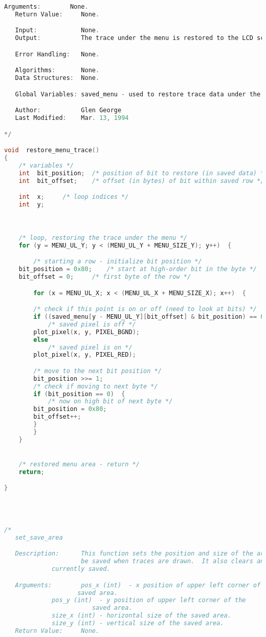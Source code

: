 \begin{lstlisting}[language=C]
   Arguments:        None.
   Return Value:     None.

   Input:            None.
   Output:           The trace under the menu is restored to the LCD screen.

   Error Handling:   None.

   Algorithms:       None.
   Data Structures:  None.

   Global Variables: saved_menu - used to restore trace data under the menu.

   Author:           Glen George
   Last Modified:    Mar. 13, 1994

*/

void  restore_menu_trace()
{
    /* variables */
    int  bit_position;	/* position of bit to restore (in saved data) */
    int  bit_offset;    /* offset (in bytes) of bit within saved row */

    int  x;		/* loop indices */
    int  y;



    /* loop, restoring the trace under the menu */
    for (y = MENU_UL_Y; y < (MENU_UL_Y + MENU_SIZE_Y); y++)  {

        /* starting a row - initialize bit position */
	bit_position = 0x80;	/* start at high-order bit in the byte */
	bit_offset = 0;		/* first byte of the row */

        for (x = MENU_UL_X; x < (MENU_UL_X + MENU_SIZE_X); x++)  {

	    /* check if this point is on or off (need to look at bits) */
	    if ((saved_menu[y - MENU_UL_Y][bit_offset] & bit_position) == 0)
	        /* saved pixel is off */
		plot_pixel(x, y, PIXEL_BGND);
	    else
	        /* saved pixel is on */
		plot_pixel(x, y, PIXEL_RED);

	    /* move to the next bit position */
	    bit_position >>= 1;
	    /* check if moving to next byte */
	    if (bit_position == 0)  {
	        /* now on high bit of next byte */
		bit_position = 0x80;
		bit_offset++;
	    }
        }
    }


    /* restored menu area - return */
    return;

}




/*
   set_save_area

   Description:      This function sets the position and size of the area to
                     be saved when traces are drawn.  It also clears any data
		     currently saved.

   Arguments:        pos_x (int)  - x position of upper left corner of the
   				    saved area.
   		     pos_y (int)  - y position of upper left corner of the
		     		    saved area.
		     size_x (int) - horizontal size of the saved area.
		     size_y (int) - vertical size of the saved area.
   Return Value:     None.


\end{lstlisting}
